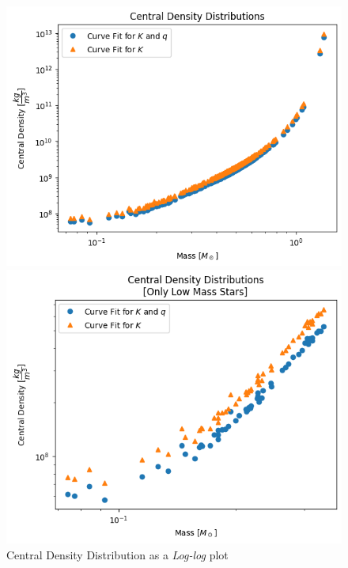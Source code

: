 \documentclass[letterpaper,12pt]{article}
\begin{document}
\begin{figure}[H]
\begin{minipage}{.5\textwidth}
\centerline{\includegraphics[width=\linewidth]{figures/appendix/1_2_1_n_ll_rho_m.png}}
\end{minipage}
\begin{minipage}{.5\textwidth}
\centerline{\includegraphics[width=\linewidth]{figures/appendix/1_2_2_n_ll_rho_m_.png}}
\end{minipage}
\caption{Central Density Distribution as a \textit{Log-log} plot}
\end{figure}
\end{document}
